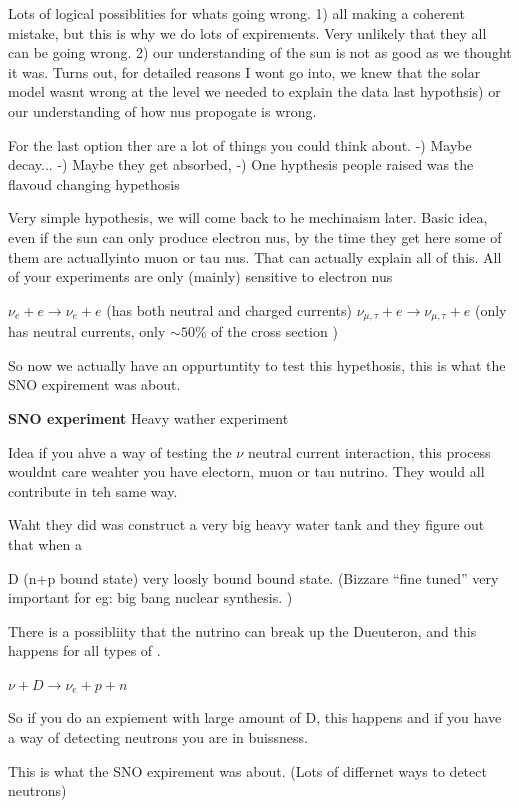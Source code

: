 {Lots of logical possiblities for whats going wrong. 
1) all making a coherent mistake, but this is why we do lots of expirements.  Very unlikely that they all can be going wrong. 
2) our understanding of the sun is not as good as we thought it was.  
    Turns out, for detailed reasons I wont go into, we knew  that the solar model wasnt wrong at the level we needed to explain the data
last hypothsis) or our understanding of how nus propogate is wrong. 

For the last option ther are a lot of things you could think about. 
 -) Maybe \nus decay...
 -) Maybe they get absorbed, 
 -) One hypthesis people raised was the flavoud changing hypethosis

Very simple hypothesis, we will come back to he mechinaism later. 
Basic idea, even if the sun can only produce electron nus, by the time they get here some of them are actuallyinto muon or tau nus. 
That can actually explain all of this.  
All of your experiments are only (mainly) sensitive to electron nus

$\nu_e + e \rightarrow \nu_e + e$  (has both neutral and charged currents) 
$\nu_{\mu,\tau} + e \rightarrow \nu_{\mu,\tau} + e$  (only has neutral currents, only $\sim50\%$ of the cross section ) 


So now we actually have an oppurtuntity to test this hypethosis, this is what the SNO expirement was about.

\textbf{SNO experiment}
Heavy wather experiment

Idea if you ahve a way of testing the $\nu$ neutral current interaction, this process wouldnt care weahter you have electorn, muon or tau nutrino. 
They would all contribute in teh same way. 

Waht they did was construct a very big heavy water tank and they figure out that when a 

D (n+p bound state) very loosly bound bound state.  (Bizzare ``fine tuned'' very important for eg: big bang nuclear synthesis. )

There is a possibliity that the nutrino can break up the Dueuteron, and this happens for all types of \nus.

$\nu + D \rightarrow \nu_e + p + n$


So if you do an expiement with large amount of D, this happens and if you have a way of detecting neutrons you are in buissness.

This is what the SNO expirement was about. (Lots of differnet ways to detect neutrons) 

}
